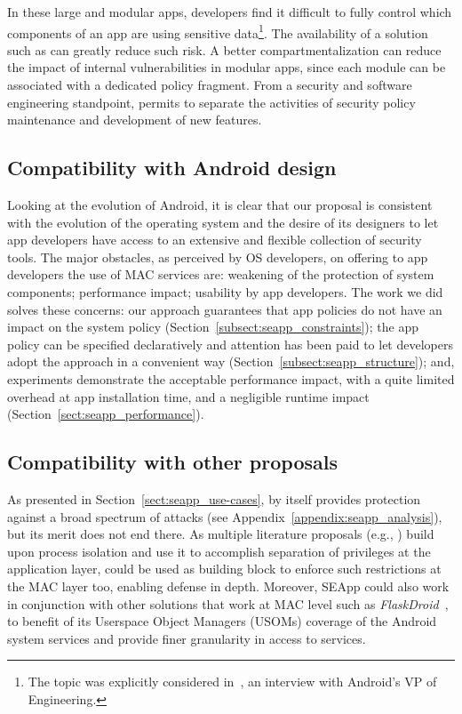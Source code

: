In these large and modular apps, developers find it difficult to fully
control which components of an app are using sensitive
data\footnote{The topic was explicitly considered
  in~\cite{seapp_burke_interview}, an interview with Android's VP of
  Engineering.}.  The availability of a solution such as \pap can
greatly reduce such risk.  A better compartmentalization can reduce
the impact of internal vulnerabilities in modular apps, since each
module can be associated with a dedicated policy fragment.  From a
security and software engineering standpoint, \pap permits to separate
the activities of security policy maintenance and development of new
features.

\subsection{Compatibility with Android design}

Looking at the evolution of Android, it is clear that our proposal is
consistent with the evolution of the operating system and the desire
of its designers to let app developers have access to an extensive and
flexible collection of security tools.  The major obstacles, as
perceived by OS developers, on offering to app developers the use of
MAC services are: weakening of the protection of system components;
performance impact; usability by app developers.  The work we did
solves these concerns: our approach guarantees that app policies do
not have an impact on the system policy
(Section~\ref{subsect:seapp_constraints}); the app policy can be
specified declaratively and attention has been paid to let developers
adopt the approach in a convenient way
(Section~\ref{subsect:seapp_structure}); and, experiments demonstrate
the acceptable performance impact, with a quite limited overhead at
app installation time, and a negligible runtime impact
(Section~\ref{sect:seapp_performance}).

\subsection{Compatibility with other proposals}
As presented in Section~\ref{sect:seapp_use-cases}, \pap by itself
provides protection against a broad spectrum of attacks (see
Appendix~\ref{appendix:seapp_analysis}), but its merit does not end
there.  As multiple literature proposals (e.g.,
\cite{seapp_10.1145/3133956.3134064, seapp_boxify, seapp_aframe})
build upon process isolation and use it to accomplish separation of
privileges at the application layer, \pap could be used as building
block to enforce such restrictions at the MAC layer too, enabling
defense in depth. Moreover, SEApp could also work in conjunction with
other solutions that work at MAC level such as {\em
  FlaskDroid}~\cite{seapp_flaskdroid}, to benefit of its Userspace
Object Managers (USOMs) coverage of the Android system services and
provide finer granularity in access to services.


